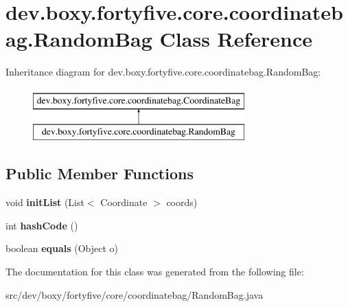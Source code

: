 \hypertarget{classdev_1_1boxy_1_1fortyfive_1_1core_1_1coordinatebag_1_1_random_bag}{
\section{dev.boxy.fortyfive.core.coordinatebag.RandomBag Class Reference}
\label{de/da9/classdev_1_1boxy_1_1fortyfive_1_1core_1_1coordinatebag_1_1_random_bag}
}
Inheritance diagram for dev.boxy.fortyfive.core.coordinatebag.RandomBag:\begin{figure}[H]
\begin{center}
\leavevmode
\includegraphics[height=2.000000cm]{de/da9/classdev_1_1boxy_1_1fortyfive_1_1core_1_1coordinatebag_1_1_random_bag}
\end{center}
\end{figure}
\subsection*{Public Member Functions}
\begin{DoxyCompactItemize}
\item 
\hypertarget{classdev_1_1boxy_1_1fortyfive_1_1core_1_1coordinatebag_1_1_random_bag_a0bacc1b38bef43c26b9a7cd470837736}{
void {\bfseries initList} (List$<$ Coordinate $>$ coords)}
\label{de/da9/classdev_1_1boxy_1_1fortyfive_1_1core_1_1coordinatebag_1_1_random_bag_a0bacc1b38bef43c26b9a7cd470837736}

\item 
\hypertarget{classdev_1_1boxy_1_1fortyfive_1_1core_1_1coordinatebag_1_1_random_bag_ad8f35c256bd7d76583ee0b4bb3a000a6}{
int {\bfseries hashCode} ()}
\label{de/da9/classdev_1_1boxy_1_1fortyfive_1_1core_1_1coordinatebag_1_1_random_bag_ad8f35c256bd7d76583ee0b4bb3a000a6}

\item 
\hypertarget{classdev_1_1boxy_1_1fortyfive_1_1core_1_1coordinatebag_1_1_random_bag_a860ecc217e11a52071d572cf84ff34a9}{
boolean {\bfseries equals} (Object o)}
\label{de/da9/classdev_1_1boxy_1_1fortyfive_1_1core_1_1coordinatebag_1_1_random_bag_a860ecc217e11a52071d572cf84ff34a9}

\end{DoxyCompactItemize}


The documentation for this class was generated from the following file:\begin{DoxyCompactItemize}
\item 
src/dev/boxy/fortyfive/core/coordinatebag/RandomBag.java\end{DoxyCompactItemize}
